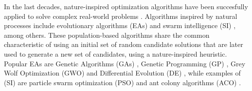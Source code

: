 \documentclass[review]{elsarticle}
\begin{document}
In the last decades, nature-inspired optimization algorithms have been succesfully
applied to solve complex real-world problems \cite{yang2014nature}. Algorithms
inspired by natural processes include evolutionary algorithms (EAs)
\cite{back1996evolutionary} and swarm intelligence (SI) \cite{kennedy2006swarm},
among others. These population-based algorithms share the common characteristic
of using an initial set of random candidate solutions that are later used to
generate a new set of candidates, using a nature-inspired heuristic. Popular EAs
are Genetic Algorithms (GAs) \cite{holland1992adaptation,eiben2003genetic}, 
Genetic Programming (GP) \cite{back1996evolutionary}, Grey Wolf Optimization
(GWO) \cite{mirjalili2014grey} and Differential Evolution (DE) \cite{karabouga2004simple},
while examples of (SI) \cite{kennedy2006swarm} are particle swarm
optimization (PSO) \cite{clerc2010particle} and ant colony algorithms (ACO) \cite{dorigo1999ant}.
\end{document}
